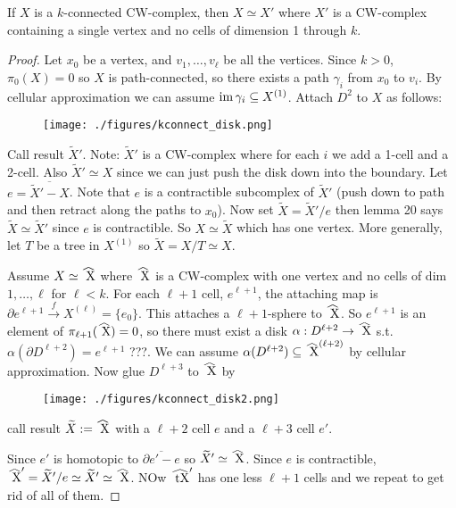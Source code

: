 \documentclass[12pt,class=article,crop=false]{standalone}
\begin{document}
\begin{thm}
If $ X$ is a  $ k$-connected  CW-complex, then  $ X \simeq X'$ where $ X'$ is a CW-complex containing a single vertex and no cells of dimension 1 through  $ k$.
\end{thm}
\begin{proof}
Let $ x_0$ be a vertex, and $ v_1,\ldots,v_\ell$ be all the vertices. Since $ k>0$, $ \pi_0(X) = 0$ so $ X$ is path-connected, so there exists a path  $ \gamma_i$ from $ x_0$ to $ v_i$. By cellular approximation we can assume $ \operatorname{im} \gamma_i \subseteq X^{(1)}$. Attach $ D^2$ to $ X$ as follows:
~\begin{figure}[H]
	\centering
	\texttt{[image: ./figures/kconnect\_disk.png]}
\end{figure}
Call result $ \widetilde{ X}'$. Note: $ \widetilde{ X}'$ is a CW-complex where for each $ i$ we add a 1-cell and a 2-cell. Also $ \widetilde{ X}' \simeq X$ since we can just push the disk down into the boundary. Let $ e = \overline{ \widetilde{ X}' - X} $. Note that $ e$ is a contractible subcomplex of  $ \widetilde{ X}'$ (push down to path and then retract along the paths to $ x_0$). Now set $ \widetilde{ X} = \widetilde{ X}' / e$ then lemma 20 says $ \widetilde{ X}  \simeq \widetilde{ X}'$ since $ e$ is contractible. So  $ X \simeq \widetilde{ X}$ which has one vertex. More generally, let $ T$ be a tree in  $ X^{(1)}$ so $ \widetilde{ X} = X /T \simeq X$.

Assume $ X \simeq \wh{ X}$ where $ \wh{ X}$ is a CW-complex with one vertex and no cells of dim $ 1,\ldots,\ell$ for $ \ell < k$. For each $ \ell+1$ cell, $ e^{\ell+1}$, the attaching map is $ \partial e^{\ell+1} \xrightarrow{ f} X^{( \ell)} = \{e_0\} $. This attaches a $ \ell+1$-sphere to $ \wh{ X}$. So $ e^{\ell+1}$ is an element of $ \pi_{\ell+1}(\wh{ X})=0$, so there must exist a disk $ \alpha: D^{\ell+2} \to \wh{ X}$ s.t.\ $ \alpha( \partial D^{\ell+2}) = e^{\ell+1}$ ???. We can assume $ \alpha(D^{\ell+2}) \subseteq \wh{ X} ^{(\ell+2)}$ by cellular approximation. Now glue $ D^{\ell+3}$ to $ \wh{ X}$ by 
~\begin{figure}[H]
	\centering
	\texttt{[image: ./figures/kconnect\_disk2.png]}
\end{figure}
call result $ \widetilde{ X} := \wh{ X}$ with a $ \ell+2$ cell $ e$ and a  $ \ell+3$ cell $ e'$.

Since  $ e'$ is homotopic to  $ \overline{\partial e' - e}$ so $ \widetilde{ X} ' \simeq \wh{ X}$. Since $ e$ is contractible,  $ \wh{ X}' = \widetilde{ X}' / e \simeq \widetilde{ X}' \simeq \wh{ X}$. NOw $ \wh{ tX}'$ has one less $ \ell+1$ cells and we repeat to get rid of all of them.
\end{proof}
\end{document}
